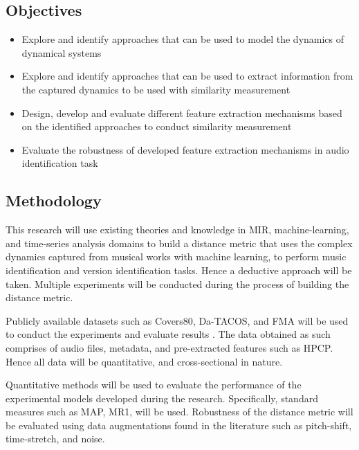 \documentclass[../main.tex]{subfiles}
\begin{document}
\newpage
\subsection{Objectives}
\begin{itemize}
  \item Explore and identify approaches that can be used to model the dynamics of dynamical systems
  \item Explore and identify approaches that can be used to extract information from the captured dynamics to be used with similarity measurement
  \item Design, develop and evaluate different feature extraction mechanisms based on the identified approaches to conduct similarity measurement
  \item Evaluate the robustness of developed feature extraction mechanisms in audio identification task
\end{itemize}



\subsection{Methodology}

\par
This research will use existing theories and knowledge in \gls{MIR}, machine-learning, and time-series analysis domains to build a distance metric that uses the complex dynamics captured from musical works with machine learning, to perform music identification and version identification tasks. Hence a deductive approach will be taken. Multiple experiments will be conducted during the process of building the distance metric.

\par
Publicly available datasets such as Covers80, Da-TACOS, and FMA will be used to conduct the experiments and evaluate results \cite{Covers80CoverSong,yesilerDaTACOSDatasetCover2019,defferrardFMADatasetMusic2017}. The data obtained as such comprises of audio files, metadata, and pre-extracted features such as \gls{HPCP}. Hence all data will be quantitative, and cross-sectional in nature.

\par
Quantitative methods will be used to evaluate the performance of the experimental models developed during the research. Specifically, standard measures such as \gls{MAP}, \gls{MR1}, will be used. Robustness of the distance metric will be evaluated using data augmentations found in the literature such as pitch-shift, time-stretch, and noise.
\end{document}
